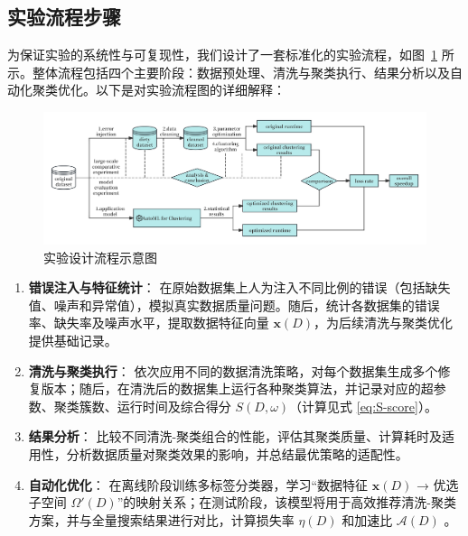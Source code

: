 \documentclass[10pt]{article} %
\numberwithin{equation}{section}
\begin{document}
\vspace{1em}
\subsection{实验流程步骤}
\label{sec:exp_flow}

为保证实验的系统性与可复现性，我们设计了一套标准化的实验流程，如图~\ref{fig:exp_workflow} 所示。整体流程包括四个主要阶段：数据预处理、清洗与聚类执行、结果分析以及自动化聚类优化。以下是对实验流程图的详细解释：

\begin{figure}[htbp]
    \centering
    \includegraphics[width=1.0\linewidth]{figures/exp_workflow.png}
    \caption{实验设计流程示意图}
    \label{fig:exp_workflow}
\end{figure}

\begin{enumerate}
    \item \textbf{错误注入与特征统计}：  
    在原始数据集上人为注入不同比例的错误（包括缺失值、噪声和异常值），模拟真实数据质量问题。随后，统计各数据集的错误率、缺失率及噪声水平，提取数据特征向量 \(\mathbf{x}(D)\)，为后续清洗与聚类优化提供基础记录。

    \item \textbf{清洗与聚类执行}：  
    依次应用不同的数据清洗策略，对每个数据集生成多个修复版本；随后，在清洗后的数据集上运行各种聚类算法，并记录对应的超参数、聚类簇数、运行时间及综合得分 \(S(D,\omega)\)（计算见式 \eqref{eq:S-score}）。

    \item \textbf{结果分析}：  
    比较不同清洗-聚类组合的性能，评估其聚类质量、计算耗时及适用性，分析数据质量对聚类效果的影响，并总结最优策略的适配性。

    \item \textbf{自动化优化}：  
    在离线阶段训练多标签分类器，学习“数据特征 \(\mathbf{x}(D)\) → 优选子空间 \(\Omega'(D)\)”的映射关系；在测试阶段，该模型将用于高效推荐清洗-聚类方案，并与全量搜索结果进行对比，计算损失率 \(\eta(D)\) 和加速比 \(\mathcal{A}(D)\) 。
\end{enumerate}
\end{document}
